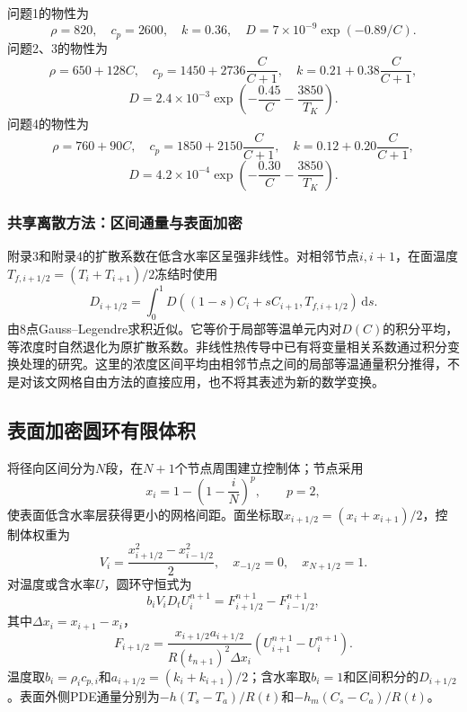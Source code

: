 \documentclass[UTF8,zihao=-4,a4paper]{ctexart}
\newcommand{\dd}{\,\mathrm d}
\begin{document}
问题1的物性为
\begin{equation}
\rho=820,\quad c_p=2600,\quad k=0.36,\quad D=7\times10^{-9}\exp(-0.89/C).
\end{equation}
问题2、3的物性为
\begin{equation}
\rho=650+128C,\quad c_p=1450+2736\frac{C}{C+1},\quad k=0.21+0.38\frac{C}{C+1},
\end{equation}
\begin{equation}
D=2.4\times10^{-3}\exp\left(-\frac{0.45}{C}-\frac{3850}{T_K}\right).
\end{equation}
问题4的物性为
\begin{equation}
\rho=760+90C,\quad c_p=1850+2150\frac{C}{C+1},\quad k=0.12+0.20\frac{C}{C+1},
\end{equation}
\begin{equation}
D=4.2\times10^{-4}\exp\left(-\frac{0.30}{C}-\frac{3850}{T_K}\right).
\end{equation}
\subsubsection{共享离散方法：区间通量与表面加密}
附录3和附录4的扩散系数在低含水率区呈强非线性。对相邻节点$i,i+1$，在面温度$T_{f,i+1/2}=(T_i+T_{i+1})/2$冻结时使用
\begin{equation}
D_{i+1/2}=\int_0^1D((1-s)C_i+sC_{i+1},T_{f,i+1/2})\dd s.
\end{equation}
由8点Gauss--Legendre求积近似。它等价于局部等温单元内对$D(C)$的积分平均，等浓度时自然退化为原扩散系数。非线性热传导中已有将变量相关系数通过积分变换处理的研究\cite{stevens2010}。这里的浓度区间平均由相邻节点之间的局部等温通量积分推得，不是对该文网格自由方法的直接应用，也不将其表述为新的数学变换。

\subsection{表面加密圆环有限体积}
将径向区间分为$N$段，在$N+1$个节点周围建立控制体；节点采用
\begin{equation}
x_i=1-\left(1-\frac{i}{N}\right)^p,\qquad p=2,
\end{equation}
使表面低含水率层获得更小的网格间距。面坐标取$x_{i+1/2}=(x_i+x_{i+1})/2$，控制体权重为
\begin{equation}
V_i=\frac{x_{i+1/2}^2-x_{i-1/2}^2}{2},\quad x_{-1/2}=0,\quad x_{N+1/2}=1.
\end{equation}
对温度或含水率$U$，圆环守恒式为
\begin{equation}
b_iV_i D_t U_i^{n+1}=F_{i+1/2}^{n+1}-F_{i-1/2}^{n+1},
\end{equation}
其中$\Delta x_i=x_{i+1}-x_i$，
\begin{equation}
F_{i+1/2}=\frac{x_{i+1/2}a_{i+1/2}}{R(t_{n+1})^2\Delta x_i}(U_{i+1}^{n+1}-U_i^{n+1}).
\end{equation}
温度取$b_i=\rho_ic_{p,i}$和$a_{i+1/2}=(k_i+k_{i+1})/2$；含水率取$b_i=1$和区间积分的$D_{i+1/2}$。表面外侧PDE通量分别为$-h(T_s-T_a)/R(t)$和$-h_m(C_s-C_a)/R(t)$。
\end{document}
